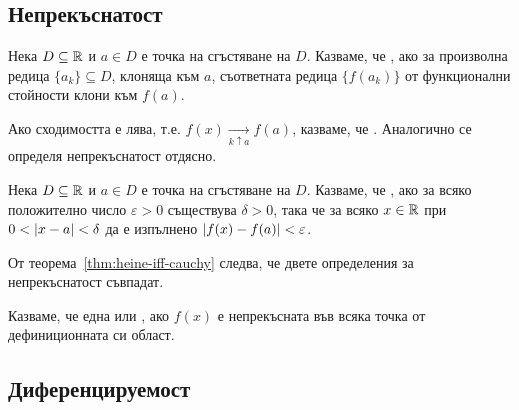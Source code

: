 \documentclass[numbers=endperiod, bibliography=totocnumbered]{scrartcl}
\begin{document}
\subsection{Непрекъснатост}

\begin{definition}
  Нека \( D \subseteq \mathbb{R} \) и \( a \in D \) е точка на сгъстяване на \( D \). Казваме, че , ако за произволна редица \( \{ a_k \} \subseteq D \), клоняща към \( a \), съответната редица \( \{ f(a_k) \} \) от функционални стойности клони към \( f(a) \).

  Ако сходимостта е лява, т.е. \( f(x) \underset {k \uparrow a} \longrightarrow f(a) \), казваме, че . Аналогично се определя непрекъснатост отдясно.
\end{definition}

\begin{definition}
  Нека \( D \subseteq \mathbb{R} \) и \( a \in D \) е точка на сгъстяване на \( D \). Казваме, че , ако за всяко положително число \( \varepsilon > 0 \) съществува \( \delta > 0 \), така че за всяко \( x \in \mathbb{R} \) при \( 0 < \left\vert x - a \right\vert < \delta \) да е изпълнено \( \left\vert f(x) - f(a) \right\vert < \varepsilon \).
\end{definition}

\begin{note}
  От теорема~\ref{thm:heine-iff-cauchy} следва, че двете определения за непрекъснатост съвпадат.
\end{note}

\begin{definition}
  Казваме, че една  или , ако \( f(x) \) е непрекъсната във всяка точка от дефиниционната си област.
\end{definition}

\subsection{Диференцируемост}
\end{document}
